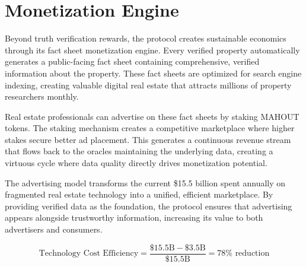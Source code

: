 \section{Monetization Engine}

Beyond truth verification rewards, the protocol creates sustainable economics through its fact sheet monetization engine. Every verified property automatically generates a public-facing fact sheet containing comprehensive, verified information about the property. These fact sheets are optimized for search engine indexing, creating valuable digital real estate that attracts millions of property researchers monthly.

Real estate professionals can advertise on these fact sheets by staking MAHOUT tokens. The staking mechanism creates a competitive marketplace where higher stakes secure better ad placement. This generates a continuous revenue stream that flows back to the oracles maintaining the underlying data, creating a virtuous cycle where data quality directly drives monetization potential.

The advertising model transforms the current \$15.5 billion spent annually on fragmented real estate technology into a unified, efficient marketplace. By providing verified data as the foundation, the protocol ensures that advertising appears alongside trustworthy information, increasing its value to both advertisers and consumers.

\[
\text{Technology Cost Efficiency} = \frac{\$15.5\text{B} - \$3.5\text{B}}{\$15.5\text{B}} = 78\% \text{ reduction}
\]


